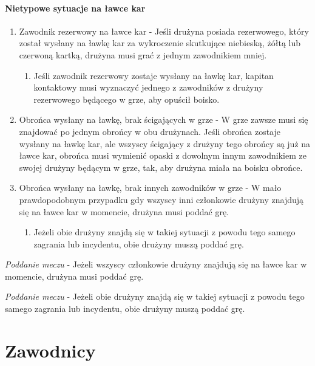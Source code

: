 \documentclass[12pt]{article}
\begin{document}
\paragraph{Nietypowe sytuacje na ławce kar}

\begin{enumerate}
\item
    Zawodnik rezerwowy na ławce kar - Jeśli drużyna posiada rezerwowego,
  który został wysłany na ławkę kar za wykroczenie skutkujące niebieską,
  żółtą lub czerwoną kartką, drużyna musi grać z jednym zawodnikiem
  mniej.
  
  \begin{enumerate}
  \item
        Jeśli zawodnik rezerwowy zostaje wysłany na ławkę kar, kapitan
    kontaktowy musi wyznaczyć jednego z zawodników z drużyny rezerwowego
    będącego w grze, aby opuścił boisko.
      \end{enumerate}
\item
    Obrońca wysłany na ławkę, brak ścigających w grze - W grze zawsze musi
  się znajdować po jednym obrońcy w obu drużynach. Jeśli obrońca zostaje
  wysłany na ławkę kar, ale wszyscy ścigający z drużyny tego obrońcy są
  już na ławce kar, obrońca musi wymienić opaski z dowolnym innym
  zawodnikiem ze swojej drużyny będącym w grze, tak, aby drużyna miała
  na boisku obrońce.
  \item
    Obrońca wysłany na ławkę, brak innych zawodników w grze - W mało
  prawdopodobnym przypadku gdy wszyscy inni członkowie drużyny znajdują
  się na ławce kar w momencie, drużyna musi poddać grę.
  
  \begin{enumerate}
  \item
        Jeżeli obie drużyny znajdą się w takiej sytuacji z powodu tego
    samego zagrania lub incydentu, obie drużyny muszą poddać grę.
      \end{enumerate}
\end{enumerate}

\emph{Poddanie meczu} - Jeżeli wszyscy członkowie drużyny znajdują się
na ławce kar w momencie, drużyna musi poddać grę.

\emph{Poddanie meczu} - Jeżeli obie drużyny znajdą się w takiej sytuacji
z powodu tego samego zagrania lub incydentu, obie drużyny muszą poddać
grę.


\pagebreak
\section{Zawodnicy}
\end{document}
